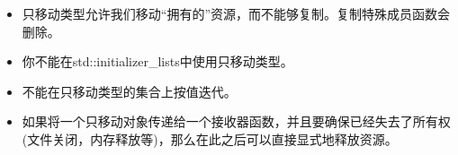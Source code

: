 \begin{itemize}
	\item 只移动类型允许我们移动“拥有的”资源，而不能够复制。复制特殊成员函数会删除。
	\item 你不能在std::initializer\_lists中使用只移动类型。
	\item 不能在只移动类型的集合上按值迭代。
	\item 如果将一个只移动对象传递给一个接收器函数，并且要确保已经失去了所有权(文件关闭，内存释放等)，那么在此之后可以直接显式地释放资源。
\end{itemize}


\newpage
